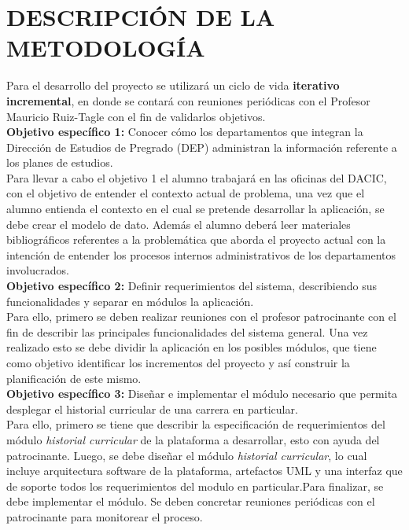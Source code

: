 \documentclass[12pt]{article}
\begin{document}
	
	\newpage

\section{DESCRIPCIÓN DE LA METODOLOGÍA}

Para el desarrollo del proyecto  se utilizará un ciclo de vida {\bf iterativo incremental}, en donde se contará con reuniones periódicas con el Profesor Mauricio Ruiz-Tagle  con el fin de validarlos objetivos.
\\

\textbf{Objetivo específico 1:} Conocer cómo los departamentos que integran la Dirección de Estudios de Pregrado (DEP) administran
								la información referente a los planes de estudios.
								\\
								
Para llevar a cabo el objetivo 1 el alumno trabajará en las oficinas del DACIC, con el objetivo  de  entender el contexto actual de problema, una vez que el alumno entienda el contexto en el cual se pretende desarrollar la aplicación, se  debe crear el modelo de dato. Además el alumno deberá leer materiales bibliográficos  referentes a la problemática que aborda el proyecto actual con la intención de entender los procesos internos administrativos de los departamentos involucrados.
\\
					
\textbf{Objetivo específico 2:} Definir requerimientos del sistema, describiendo sus funcionalidades y separar en módulos la aplicación.
\\

Para ello, primero se deben realizar reuniones con el profesor patrocinante con el fin de describir las principales funcionalidades del sistema general. Una vez realizado esto se debe dividir la aplicación en los posibles módulos, que tiene como objetivo   identificar los incrementos del proyecto y así construir la planificación de este mismo.  
\\

\textbf{Objetivo específico 3:} Diseñar e implementar el módulo necesario que permita desplegar el historial curricular de una carrera en particular.
\\


Para ello, primero se tiene que describir la especificación de requerimientos del módulo \textit{historial curricular} de la plataforma a desarrollar, esto con ayuda del patrocinante. Luego, se debe diseñar el módulo  \textit{historial curricular}, lo cual incluye arquitectura software de la plataforma, artefactos UML y una interfaz que de soporte todos los requerimientos del modulo en particular.Para finalizar, se debe implementar el módulo. Se deben concretar reuniones periódicas con el patrocinante  para monitorear el proceso.
\\
\end{document}
